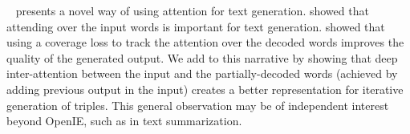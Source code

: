     \shortname~ presents a novel way of using attention for text generation. \citet{bahdanau&al15} showed that attending over the input words is important for text generation. \citet{see&al17} showed that using a coverage loss to track the attention over the decoded words improves the quality of the generated output. We add to this narrative by showing that deep inter-attention between the input and the partially-decoded words (achieved by adding previous output in the input) creates a better representation for iterative generation of triples. This general observation may be of independent interest beyond OpenIE, such as in text summarization.





    
